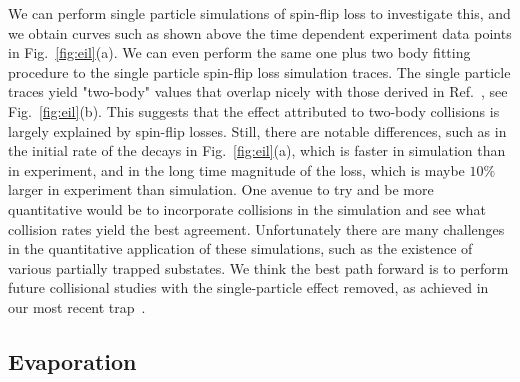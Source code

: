 \documentclass[%
 reprint,
 amsmath,amssymb,
 aps,
pra,
]{revtex4-1}
\begin{document}
We can perform single particle simulations of spin-flip loss to investigate this, and we obtain curves such as shown above the time dependent experiment data points in Fig.~\ref{fig:eil}(a).
We can even perform the same one plus two body fitting procedure to the single particle spin-flip loss simulation traces.
The single particle traces yield "two-body" values that overlap nicely with those derived in Ref.~\cite{Stuhl2013}, see Fig.~\ref{fig:eil}(b).
This suggests that the effect attributed to two-body collisions is largely explained by spin-flip losses.
Still, there are notable differences, such as in the initial rate of the decays in Fig.~\ref{fig:eil}(a), which is faster in simulation than in experiment, and in the long time magnitude of the loss, which is maybe $10\%$ larger in experiment than simulation.
One avenue to try and be more quantitative would be to incorporate collisions in the simulation and see what collision rates yield the best agreement.
Unfortunately there are many challenges in the quantitative application of these simulations, such as the existence of various partially trapped substates.
We think the best path forward is to perform future collisional studies with the single-particle effect removed, as achieved in our most recent trap~\cite{smt}.

\subsection{Evaporation\label{sec:evap}}
\end{document}
